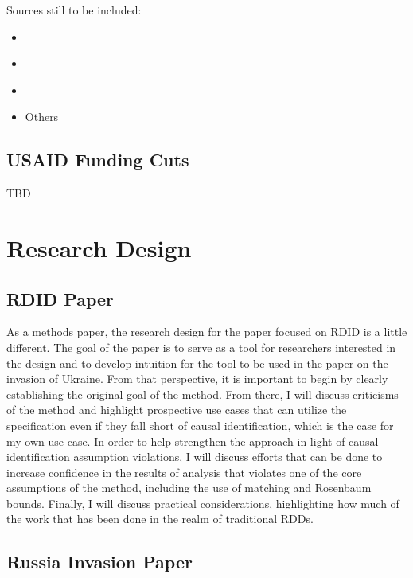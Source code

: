 \documentclass[12pt]{article}
\begin{document}
Sources still to be included:

\begin{itemize}
    \item \citet{bjola_digital_2024}
    \item \citet{gilboa_internet_2002}
    \item \citet{gilboa_media_1998}
    \item Others
\end{itemize}

\subsection*{USAID Funding Cuts}

TBD



\section*{Research Design}

\subsection*{RDID Paper}

As a methods paper, the research design for the paper focused on RDID is a little different. The goal of the paper is to serve as a tool for researchers interested in the design and to develop intuition for the tool to be used in the paper on the invasion of Ukraine. From that perspective, it is important to begin by clearly establishing the original goal of the method. From there, I will discuss criticisms of the method and highlight prospective use cases that can utilize the specification even if they fall short of causal identification, which is the case for my own use case. In order to help strengthen the approach in light of causal-identification assumption violations, I will discuss efforts that can be done to increase confidence in the results of analysis that violates one of the core assumptions of the method, including the use of matching and Rosenbaum bounds. Finally, I will discuss practical considerations, highlighting how much of the work that has been done in the realm of traditional RDDs.

\subsection*{Russia Invasion Paper}
\end{document}

